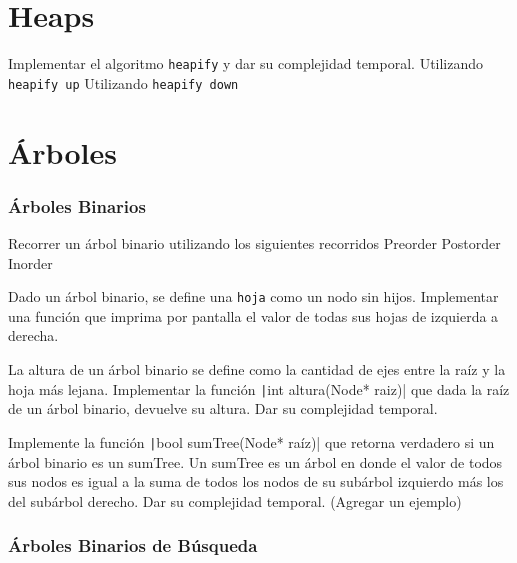 \documentclass[titlepage,oneside]{book}
\begin{document}
\chapter{Heaps}
\begin{Exercise}
	Implementar el algoritmo \texttt{heapify} y dar su complejidad temporal.
	\Question Utilizando \texttt{heapify up}
	\Question Utilizando \texttt{heapify down}

 
\end{Exercise}

\chapter{Árboles}

\subsection{Árboles Binarios}

\begin{Exercise}
	Recorrer un árbol binario utilizando los siguientes recorridos
	\Question Preorder
	\Question Postorder
        \Question Inorder
\end{Exercise}

\begin{Exercise}
	Dado un árbol binario, se define una \texttt{hoja} como un nodo sin hijos. Implementar una función que imprima por pantalla el valor de todas sus hojas de izquierda a derecha.
\end{Exercise}

\begin{Exercise}
    La altura de un árbol binario se define como la cantidad de ejes entre la raíz y la hoja más lejana. Implementar la función \texttt|int altura(Node* raiz)| que dada la raíz de un árbol binario, devuelve su altura. Dar su complejidad temporal.
\end{Exercise}

\begin{Exercise}
   Implemente la función \texttt|bool sumTree(Node* raíz)| que retorna verdadero si un árbol binario es un sumTree. Un sumTree es un árbol en donde el valor de todos sus nodos es igual a la suma de todos los nodos de su subárbol izquierdo más los del subárbol derecho. Dar su complejidad temporal. (Agregar un ejemplo)
\end{Exercise}

\subsection{Árboles Binarios de Búsqueda}
\end{document}
